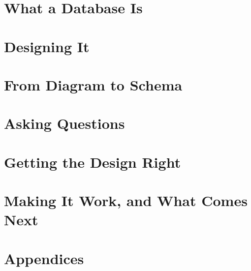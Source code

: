\documentclass[11pt,a4paper,oneside]{report}
\begin{document}


\part{What a Database Is}






\part{Designing It}






\part{From Diagram to Schema}





\part{Asking Questions}







\part{Getting the Design Right}






\part{Making It Work, and What Comes Next}





\appendix
\part*{Appendices}







\end{document}
